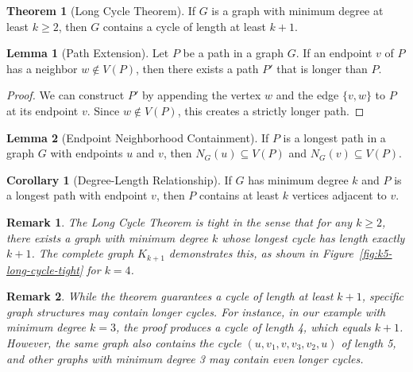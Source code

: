 \documentclass{article}
\newtheorem{remark}{Remark}
\theoremstyle{definition}
\newtheorem{theorem}{Theorem}
\newtheorem{lemma}{Lemma}
\newtheorem{corollary}{Corollary}
\begin{document}
\begin{theorem}[Long Cycle Theorem]
If $G$ is a graph with minimum degree at least $k \geq 2$, then $G$ contains a cycle of length at least $k + 1$.
\end{theorem}

\begin{lemma}[Path Extension]
Let $P$ be a path in a graph $G$. If an endpoint $v$ of $P$ has a neighbor $w \notin V(P)$, then there exists a path $P'$ that is longer than $P$.
\end{lemma}

\begin{proof}
We can construct $P'$ by appending the vertex $w$ and the edge $\{v,w\}$ to $P$ at its endpoint $v$. Since $w \notin V(P)$, this creates a strictly longer path.
\end{proof}

\begin{lemma}[Endpoint Neighborhood Containment]
If $P$ is a longest path in a graph $G$ with endpoints $u$ and $v$, then $N_G(u) \subseteq V(P)$ and $N_G(v) \subseteq V(P)$.
\end{lemma}

\begin{corollary}[Degree-Length Relationship]
If $G$ has minimum degree $k$ and $P$ is a longest path with endpoint $v$, then $P$ contains at least $k$ vertices adjacent to $v$.
\end{corollary}

\begin{remark}
The Long Cycle Theorem is tight in the sense that for any $k \geq 2$, there exists a graph with minimum degree $k$ whose longest cycle has length exactly $k+1$. The complete graph $K_{k+1}$ demonstrates this, as shown in Figure~\ref{fig:k5-long-cycle-tight} for $k = 4$.
\end{remark}

\begin{remark}
While the theorem guarantees a cycle of length at least $k+1$, specific graph structures may contain longer cycles. For instance, in our example with minimum degree $k=3$, the proof produces a cycle of length 4, which equals $k+1$. However, the same graph also contains the cycle $(u, v_1, v, v_3, v_2, u)$ of length 5, and other graphs with minimum degree 3 may contain even longer cycles.
\end{remark}
\end{document}
